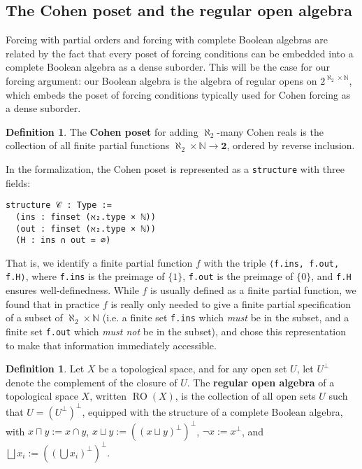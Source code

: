 \documentclass[a4paper,USenglish,cleveref, autoref]{lipics-v2019}
\newcommand{\lil}{\lstinline}
\theoremstyle{definition}
\newtheorem{defn}[theorem]{Definition}
\begin{document}
\subsection{The Cohen poset and the regular open algebra}
Forcing with partial orders and forcing with complete Boolean algebras are related by the fact that every poset of forcing conditions can be embedded into a complete Boolean algebra as a dense suborder. This will be the case for our forcing argument: our Boolean algebra is the algebra of regular opens on $2^{\aleph_2 \times \mathbb{N}}$, which embeds the poset of forcing conditions typically used for Cohen forcing as a dense suborder.
\begin{defn}
  The \textbf{Cohen poset} for adding $\aleph_2$-many Cohen reals is the collection of all finite partial functions $\aleph_2 \times \mathbb{N} \to \mathbf{2}$, ordered by reverse inclusion.
\end{defn}

In the formalization, the Cohen poset is represented as a \lstinline{structure} with three fields:
\begin{lstlisting}
structure 𝒞 : Type :=
  (ins : finset (ℵ₂.type × ℕ))
  (out : finset (ℵ₂.type × ℕ))
  (H : ins ∩ out = ∅)
\end{lstlisting}

That is, we identify a finite partial function $f$ with the triple \lil{⟨f.ins, f.out, f.H⟩}, where \lil{f.ins} is the preimage of $\{1\}$, \lil{f.out} is the preimage of $\{0\}$, and \lil{f.H} ensures well-definedness. While $f$ is usually defined as a finite partial function, we found that in practice $f$ is really only needed to give a finite partial specification of a subset of $\aleph_2 \times \mathbb{N}$ (i.e. a finite set \lil{f.ins} which \emph{must} be in the subset, and a finite set \lil{f.out} which \emph{must not} be in the subset), and chose this representation to make that information immediately accessible.

\begin{defn}
  Let $X$ be a topological space, and for any open set $U$, let $U^\perp$ denote the complement of the closure of $U$. The \textbf{regular open algebra} of a topological space $X$, written $\operatorname{RO}(X)$, is the collection of all open sets $U$ such that $U = (U^\perp)^\perp$, equipped with the structure of a complete Boolean algebra, with $x \sqcap y := x \cap y$, $x \sqcup y := ((x \sqcup y)^\perp)^\perp$, $\neg x := x^\perp$, and $\bigsqcup x_i := ((\bigcup x_i)^\perp)^\perp$.
\end{defn}
\end{document}
